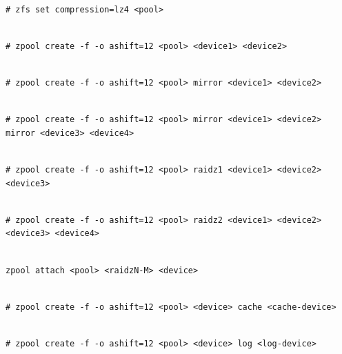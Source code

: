 \begin{lstlisting}

# zfs set compression=lz4 <pool>

\end{lstlisting}

\begin{lstlisting}

# zpool create -f -o ashift=12 <pool> <device1> <device2>

\end{lstlisting}

\begin{lstlisting}

# zpool create -f -o ashift=12 <pool> mirror <device1> <device2>

\end{lstlisting}

\begin{lstlisting}

# zpool create -f -o ashift=12 <pool> mirror <device1> <device2> mirror <device3> <device4>

\end{lstlisting}

\begin{lstlisting}

# zpool create -f -o ashift=12 <pool> raidz1 <device1> <device2> <device3>

\end{lstlisting}

\begin{lstlisting}

# zpool create -f -o ashift=12 <pool> raidz2 <device1> <device2> <device3> <device4>

\end{lstlisting}

\begin{lstlisting}

zpool attach <pool> <raidzN-M> <device>

\end{lstlisting}

\begin{lstlisting}

# zpool create -f -o ashift=12 <pool> <device> cache <cache-device>

\end{lstlisting}

\begin{lstlisting}

# zpool create -f -o ashift=12 <pool> <device> log <log-device>

\end{lstlisting}

